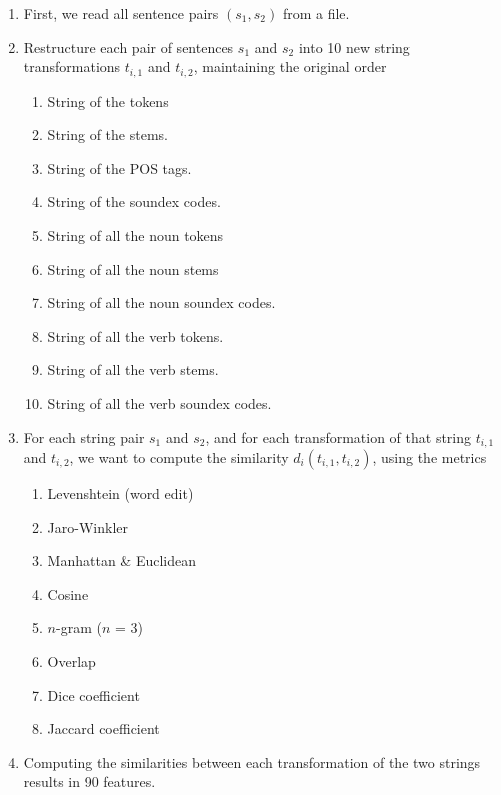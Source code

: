 \documentclass[11pt, reqno]{amsart}
\begin{document}
	\begin{enumerate}
	\item First, we read all sentence pairs $(s_1, s_2)$ from a file.
	\item Restructure each pair of sentences $s_1$ and $s_2$ into 10 new string transformations $t_{i,1}$ and $t_{i,2}$, maintaining the original order
		\begin{multicols}{2}
		\begin{enumerate}
			\item String of the tokens
			\item String of the stems.
			\item String of the POS tags.
			\item String of the soundex codes\cite{soundex}.
			\item String of all the noun tokens
			\item String of all the noun stems
			\item String of all the noun soundex codes.
			\item String of all the verb tokens.
			\item String of all the verb stems.
			\item String of all the verb soundex codes.
		\end{enumerate}
		\end{multicols}
	\item For each string pair $s_1$ and $s_2$, and for each transformation of that string $t_{i,1}$ and $t_{i,2}$, we want to compute the similarity \cite{malakasiotis2007learning} $d_i(t_{i,1},t_{i,2})$, using the metrics 
		\begin{multicols}{2}
		\begin{enumerate}
		\item Levenshtein (word edit)
		\item Jaro-Winkler
		\item Manhattan \& Euclidean
		\item Cosine
		\item $n$-gram ($n$ = 3)
		\item Overlap
		\item Dice coefficient
		\item Jaccard coefficient 
		\end{enumerate}
		\end{multicols}
	\item Computing the similarities between each transformation of the two strings results in 90 features. 

\end{enumerate}
\end{document}
